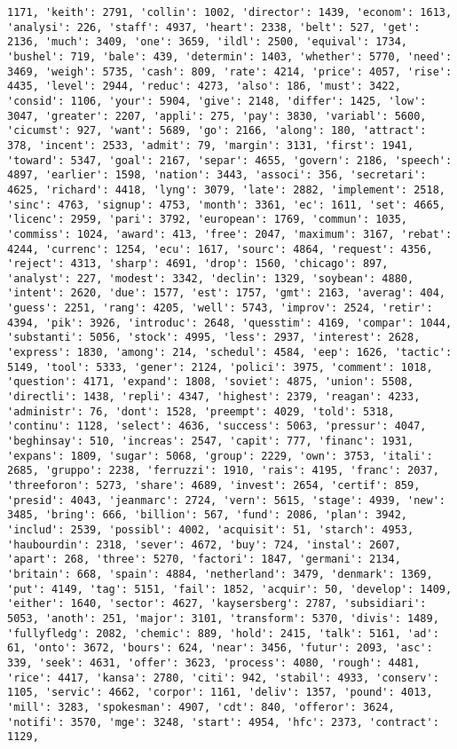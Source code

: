 \documentclass[11pt]{article}
\begin{document}
\begin{Verbatim}[commandchars=\\\{\}]
1171, 'keith': 2791, 'collin': 1002, 'director': 1439, 'econom': 1613, 'analysi': 226, 'staff': 4937, 'heart': 2338, 'belt': 527, 'get': 2136, 'much': 3409, 'one': 3659, 'ildl': 2500, 'equival': 1734, 'bushel': 719, 'bale': 439, 'determin': 1403, 'whether': 5770, 'need': 3469, 'weigh': 5735, 'cash': 809, 'rate': 4214, 'price': 4057, 'rise': 4435, 'level': 2944, 'reduc': 4273, 'also': 186, 'must': 3422, 'consid': 1106, 'your': 5904, 'give': 2148, 'differ': 1425, 'low': 3047, 'greater': 2207, 'appli': 275, 'pay': 3830, 'variabl': 5600, 'cicumst': 927, 'want': 5689, 'go': 2166, 'along': 180, 'attract': 378, 'incent': 2533, 'admit': 79, 'margin': 3131, 'first': 1941, 'toward': 5347, 'goal': 2167, 'separ': 4655, 'govern': 2186, 'speech': 4897, 'earlier': 1598, 'nation': 3443, 'associ': 356, 'secretari': 4625, 'richard': 4418, 'lyng': 3079, 'late': 2882, 'implement': 2518, 'sinc': 4763, 'signup': 4753, 'month': 3361, 'ec': 1611, 'set': 4665, 'licenc': 2959, 'pari': 3792, 'european': 1769, 'commun': 1035, 'commiss': 1024, 'award': 413, 'free': 2047, 'maximum': 3167, 'rebat': 4244, 'currenc': 1254, 'ecu': 1617, 'sourc': 4864, 'request': 4356, 'reject': 4313, 'sharp': 4691, 'drop': 1560, 'chicago': 897, 'analyst': 227, 'modest': 3342, 'declin': 1329, 'soybean': 4880, 'intent': 2620, 'due': 1577, 'est': 1757, 'gmt': 2163, 'averag': 404, 'guess': 2251, 'rang': 4205, 'well': 5743, 'improv': 2524, 'retir': 4394, 'pik': 3926, 'introduc': 2648, 'quesstim': 4169, 'compar': 1044, 'substanti': 5056, 'stock': 4995, 'less': 2937, 'interest': 2628, 'express': 1830, 'among': 214, 'schedul': 4584, 'eep': 1626, 'tactic': 5149, 'tool': 5333, 'gener': 2124, 'polici': 3975, 'comment': 1018, 'question': 4171, 'expand': 1808, 'soviet': 4875, 'union': 5508, 'directli': 1438, 'repli': 4347, 'highest': 2379, 'reagan': 4233, 'administr': 76, 'dont': 1528, 'preempt': 4029, 'told': 5318, 'continu': 1128, 'select': 4636, 'success': 5063, 'pressur': 4047, 'beghinsay': 510, 'increas': 2547, 'capit': 777, 'financ': 1931, 'expans': 1809, 'sugar': 5068, 'group': 2229, 'own': 3753, 'itali': 2685, 'gruppo': 2238, 'ferruzzi': 1910, 'rais': 4195, 'franc': 2037, 'threeforon': 5273, 'share': 4689, 'invest': 2654, 'certif': 859, 'presid': 4043, 'jeanmarc': 2724, 'vern': 5615, 'stage': 4939, 'new': 3485, 'bring': 666, 'billion': 567, 'fund': 2086, 'plan': 3942, 'includ': 2539, 'possibl': 4002, 'acquisit': 51, 'starch': 4953, 'haubourdin': 2318, 'sever': 4672, 'buy': 724, 'instal': 2607, 'apart': 268, 'three': 5270, 'factori': 1847, 'germani': 2134, 'britain': 668, 'spain': 4884, 'netherland': 3479, 'denmark': 1369, 'put': 4149, 'tag': 5151, 'fail': 1852, 'acquir': 50, 'develop': 1409, 'either': 1640, 'sector': 4627, 'kaysersberg': 2787, 'subsidiari': 5053, 'anoth': 251, 'major': 3101, 'transform': 5370, 'divis': 1489, 'fullyfledg': 2082, 'chemic': 889, 'hold': 2415, 'talk': 5161, 'ad': 61, 'onto': 3672, 'bours': 624, 'near': 3456, 'futur': 2093, 'asc': 339, 'seek': 4631, 'offer': 3623, 'process': 4080, 'rough': 4481, 'rice': 4417, 'kansa': 2780, 'citi': 942, 'stabil': 4933, 'conserv': 1105, 'servic': 4662, 'corpor': 1161, 'deliv': 1357, 'pound': 4013, 'mill': 3283, 'spokesman': 4907, 'cdt': 840, 'offeror': 3624, 'notifi': 3570, 'mge': 3248, 'start': 4954, 'hfc': 2373, 'contract': 1129, 
\end{Verbatim}
\end{document}
